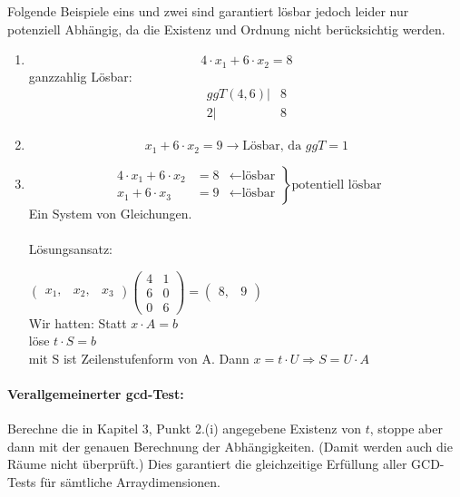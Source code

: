 Folgende Beispiele eins und zwei sind garantiert lösbar jedoch leider nur potenziell Abhängig, da die Existenz und Ordnung nicht berücksichtig werden.

\begin{enumerate}
  \item {
      \[4 \cdot x_1 + 6 \cdot x_2 = 8 \]
      ganzzahlig Lösbar: \\
      \begin{align*}
         ggT(4,6) |& 8\\
               2  |& 8
      \end{align*}
    }
  \item {\[x_1 + 6 \cdot x_2 = 9 \rightarrow \text{Lösbar, da } ggT = 1 \]}
  \item {
      \[ \left.
          \begin{split}
            4 \cdot x_1 + 6 \cdot x_2 &= 8 &\leftarrow \text{lösbar}\\
            x_1 + 6 \cdot x_3 &= 9 &\leftarrow \text{lösbar}
          \end{split}
       \right\rbrace{\text{potentiell lösbar}} \]
       Ein System von Gleichungen.\\
\\
       Lösungsansatz:

\( \begin{pmatrix}
    x_1 ,& x_2 ,& x_3
   \end{pmatrix}
   \begin{pmatrix}
     4 & 1\\
     6 & 0\\
     0 & 6
   \end{pmatrix}
=
   \begin{pmatrix}
     8 ,& 9
   \end{pmatrix}
\) \\
Wir hatten: Statt \(x \cdot A = b  \) \\
          löse \( t \cdot S = b \) \\
          mit S ist Zeilenstufenform von A.
          Dann \( x = t \cdot U \Rightarrow S = U \cdot A \)
        }

\end{enumerate}

\smallskip

\paragraph{Verallgemeinerter gcd-Test:} Berechne die in Kapitel 3, Punkt 2.(i)
angegebene Existenz von $t$, stoppe aber dann mit der genauen
Berechnung der Abhängigkeiten. (Damit werden auch die Räume nicht
überprüft.)  Dies garantiert die gleichzeitige Erfüllung aller
GCD-Tests für sämtliche Arraydimensionen.

